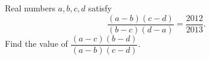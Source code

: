 Real numbers $a,b,c,d$ satisfy
\[
\dfrac{(a-b)(c-d)}{(b-c)(d-a)}=\dfrac{2012}{2013}.
\]
Find the value of $\dfrac{(a-c)(b-d)}{(a-b)(c-d)}$.
